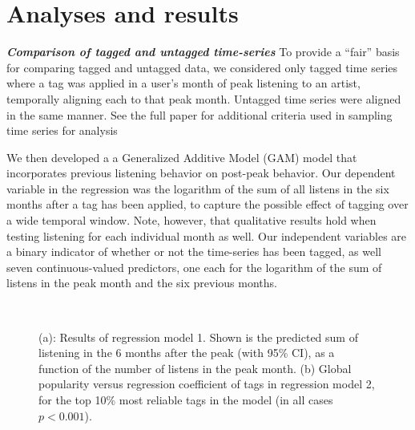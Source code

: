 \documentclass[preprint]{sig-alternate-2013}
\begin{document}
\section{Analyses and results}
\textbf{\textit{Comparison of tagged and untagged time-series}} To provide a ``fair'' basis for comparing tagged and untagged data, we considered only tagged time series where a tag was applied in a user's month of peak listening to an artist, temporally aligning each to that peak month. Untagged time series were aligned in the same manner. See the full paper for additional criteria used in sampling time series for analysis

We then developed a a Generalized Additive Model (GAM) model that incorporates previous listening behavior on post-peak behavior. Our dependent variable in the regression was the logarithm of the sum of all listens in the six months after a tag has been applied, to capture the possible effect of tagging over a wide temporal window. Note, however, that qualitative results hold when testing listening for each individual month as well. Our independent variables are a binary indicator of whether or not the time-series has been tagged, as well seven continuous-valued predictors, one each for the logarithm of the sum of listens in the peak month and the six previous months.   

  \begin{figure}[t]
\centering
     \\

    \caption{(a): Results of regression model 1. Shown is the predicted sum of listening in the 6 months after the peak (with 95\% CI), as a function of the number of listens in the peak month. (b) Global popularity versus regression coefficient of tags in regression model 2, for the top 10\% most reliable tags in the model (in all cases $p < 0.001$).}
    \label{fig:secondPlotSet}
    \vspace{-2em}
  \end{figure}
\end{document}
